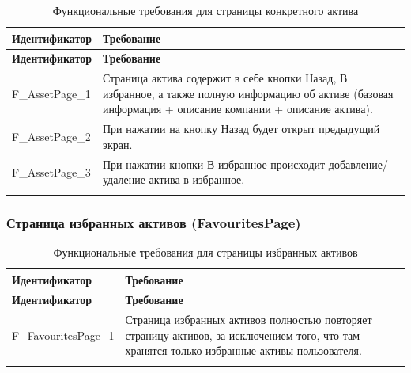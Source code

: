 \documentclass[a4paper, 14pt]{article}
\begin{document}
\begin{longtable}{| p{} | p{} |}
    \hline
    \textbf{Идентификатор}          & \textbf{Требование}                                                                                                                                                                \\
    \hline
    \endfirsthead
    \hline
    \textbf{Идентификатор}          & \textbf{Требование}                                                                                                                                                                \\
    \hline
    \endhead

    F\_AssetPage\_1                 & Страница актива содержит в себе кнопки Назад, В избранное, а также полную информацию об активе (базовая информация + описание компании + описание актива).                         \\ \hline
    F\_AssetPage\_2                 & При нажатии на кнопку Назад будет открыт предыдущий экран.                                                                                                                         \\ \hline
    F\_AssetPage\_3                 & При нажатии кнопки В избранное происходит добавление/удаление актива в избранное.                                                                                                  \\ \hline

    \caption{Функциональные требования для страницы конкретного актива}
\end{longtable}

\subsubsection{Страница избранных активов (FavouritesPage)}

\begin{longtable}{| p{} | p{} |}
    \hline
    \textbf{Идентификатор}          & \textbf{Требование}                                                                                                                                                                \\
    \hline
    \endfirsthead
    \hline
    \textbf{Идентификатор}          & \textbf{Требование}                                                                                                                                                                \\
    \hline
    \endhead

    F\_FavouritesPage\_1            & Страница избранных активов полностью повторяет страницу активов, за исключением того, что там хранятся только избранные активы пользователя.                                       \\ \hline

    \caption{Функциональные требования для страницы избранных активов}
\end{longtable}
\end{document}
